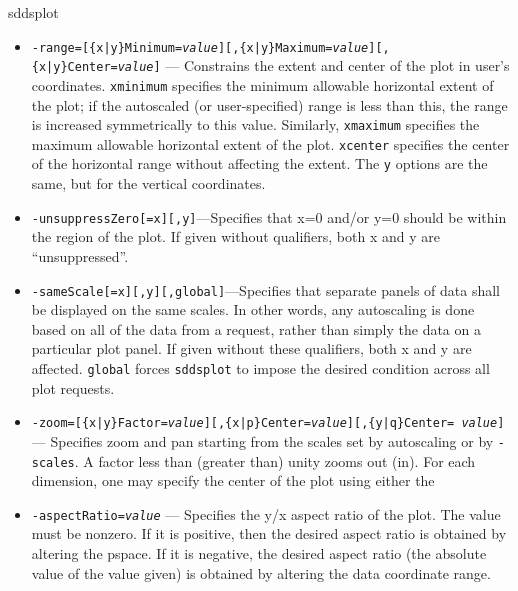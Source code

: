 \begin{sddsprog}{sddsplot}
\begin{itemize}
\begin{itemize}
 \item {\tt -range=[\{x|y\}Minimum={\em value}][,\{x|y\}Maximum={\em value}][,\{x|y\}Center={\em value}]}
        --- Constrains the extent
        and center of the plot in user's coordinates.  {\tt xminimum} specifies the minimum allowable
        horizontal extent of the plot; if the autoscaled (or user-specified) range is less than this, the
        range is increased symmetrically to this value.  Similarly, {\tt xmaximum} specifies the maximum
        allowable horizontal extent of the plot.  {\tt xcenter} specifies the center of the horizontal
        range without affecting the extent.  The {\tt y} options are the same, but for the vertical
        coordinates.
  \item {\tt -unsuppressZero[=x][,y]}---Specifies that x=0 and/or y=0 should be within the region of
the plot.  If given without qualifiers, both x and y are ``unsuppressed''.

  \item {\tt -sameScale[=x][,y][,global]}---Specifies that separate panels of data shall be displayed
on the same scales.  In other words, any autoscaling is done based on all of the data from a request,
rather than simply the data on a particular plot panel.  If given without these qualifiers, both x
and y are affected.  {\tt global} forces \verb|sddsplot| to impose the desired condition across all
plot requests.

  \item {\tt -zoom=[\{x|y\}Factor={\em value}][,\{x|p\}Center={\em value}][,\{y|q\}Center={\em
value}]} --- Specifies zoom and pan starting from the scales set by autoscaling or by {\tt -scales}.
A factor less than (greater than) unity zooms out (in).  For each dimension, one may specify the
center of the plot using either the

  \item {\tt -aspectRatio={\em value}} --- Specifies the y/x aspect ratio of the plot.  The value
must be nonzero.  If it is positive, then the desired aspect ratio is obtained by altering the
pspace.  If it is negative, the desired aspect ratio (the absolute value of the value given) is
obtained by altering the data coordinate range.


\end{itemize}
\end{itemize}
\end{sddsprog}
